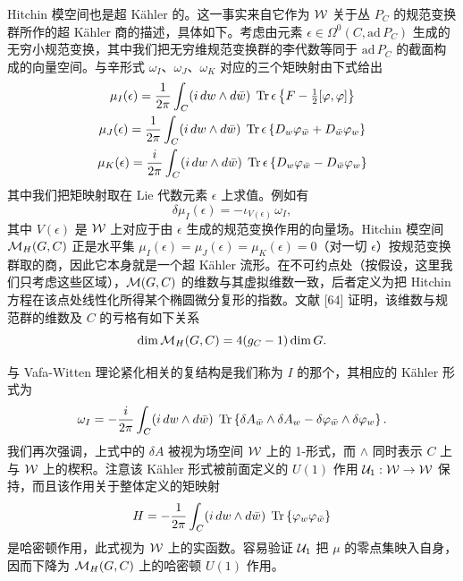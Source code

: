 Hitchin 模空间也是超 Kähler 的。这一事实来自它作为 $\mathcal{W}$ 关于丛 $P_C$ 的规范变换群所作的超 Kähler 商的描述，具体如下。考虑由元素 $\epsilon\in\Omega^0(C,\mathrm{ad}\,P_C)$ 生成的无穷小规范变换，其中我们把无穷维规范变换群的李代数等同于 $\mathrm{ad}\,P_C$ 的截面构成的向量空间。与辛形式 $\omega_I$、$\omega_J$、$\omega_K$ 对应的三个矩映射由下式给出
\begin{gather}
\mu_I(\epsilon)=\frac{1}{2\pi}\int_C(i\,d w\wedge d\bar w)\;\operatorname{Tr}\epsilon\left\{F-\tfrac12[\varphi,\varphi]\right\} \notag\\
\mu_J(\epsilon)=\frac{1}{2\pi}\int_C(i\,d w\wedge d\bar w)\;\operatorname{Tr}\epsilon\left\{D_w\varphi_{\bar w}+D_{\bar w}\varphi_w\right\} \notag\\
\mu_K(\epsilon)=\frac{i}{2\pi}\int_C(i\,d w\wedge d\bar w)\;\operatorname{Tr}\epsilon\left\{D_w\varphi_{\bar w}-D_{\bar w}\varphi_w\right\} \notag
\end{gather}
其中我们把矩映射取在 Lie 代数元素 $\epsilon$ 上求值。例如有
\[
\delta\mu_I(\epsilon)=-\iota_{V(\epsilon)}\,\omega_I,
\]
其中 $V(\epsilon)$ 是 $\mathcal{W}$ 上对应于由 $\epsilon$ 生成的规范变换作用的向量场。Hitchin 模空间 $\mathcal{M}_H(G,C)$ 正是水平集 $\mu_I(\epsilon)=\mu_J(\epsilon)=\mu_K(\epsilon)=0$（对一切 $\epsilon$）按规范变换群取的商，因此它本身就是一个超 Kähler 流形。在不可约点处（按假设，这里我们只考虑这些区域），$\mathcal{M}(G,C)$ 的维数与其虚拟维数一致，后者定义为把 Hitchin 方程在该点处线性化所得某个椭圆微分复形的指数。文献 [64] 证明，该维数与规范群的维数及 $C$ 的亏格有如下关系
\[
\dim\mathcal{M}_H(G,C)=4(g_C-1)\dim G .
\]

与 Vafa-Witten 理论紧化相关的复结构是我们称为 $I$ 的那个，其相应的 Kähler 形式为
\[
\omega_I=-\frac{i}{2\pi}\int_C(i\,d w\wedge d\bar w)\;\operatorname{Tr}\left\{\delta A_{\bar w}\wedge\delta A_w-\delta\varphi_{\bar w}\wedge\delta\varphi_w\right\}.
\]
我们再次强调，上式中的 $\delta A$ 被视为场空间 $\mathcal{W}$ 上的 1-形式，而 $\wedge$ 同时表示 $C$ 上与 $\mathcal{W}$ 上的楔积。注意该 Kähler 形式被前面定义的 $U(1)$ 作用 $\mathcal{U}_1:\mathcal{W}\to\mathcal{W}$ 保持，而且该作用关于整体定义的矩映射
\[
H=-\frac{1}{2\pi}\int_C(i\,d w\wedge d\bar w)\;\operatorname{Tr}\left\{\varphi_w\varphi_{\bar w}\right\}
\]
是哈密顿作用，此式视为 $\mathcal{W}$ 上的实函数。容易验证 $\mathcal{U}_1$ 把 $\mu$ 的零点集映入自身，因而下降为 $\mathcal{M}_H(G,C)$ 上的哈密顿 $U(1)$ 作用。

